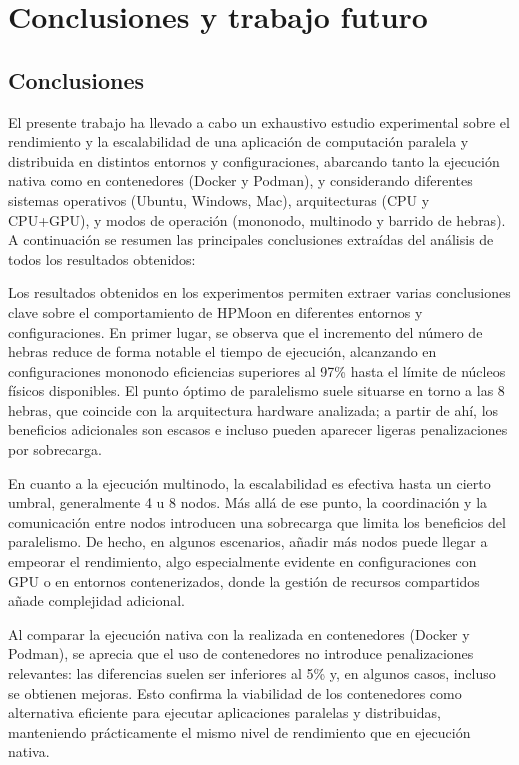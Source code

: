 \chapter{Conclusiones y trabajo futuro}\label{cap:conclusiones}


\section{Conclusiones}


El presente trabajo ha llevado a cabo un exhaustivo estudio experimental sobre el rendimiento y la escalabilidad de una aplicación de computación paralela y distribuida en distintos entornos y configuraciones, abarcando tanto la ejecución nativa como en contenedores (Docker y Podman), y considerando diferentes sistemas operativos (Ubuntu, Windows, Mac), arquitecturas (CPU y CPU+GPU), y modos de operación (mononodo, multinodo y barrido de hebras). A continuación se resumen las principales conclusiones extraídas del análisis de todos los resultados obtenidos:

Los resultados obtenidos en los experimentos permiten extraer varias conclusiones clave sobre el comportamiento de HPMoon en diferentes entornos y configuraciones. En primer lugar, se observa que el incremento del número de hebras reduce de forma notable el tiempo de ejecución, alcanzando en configuraciones mononodo eficiencias superiores al 97\% hasta el límite de núcleos físicos disponibles. El punto óptimo de paralelismo suele situarse en torno a las 8 hebras, que coincide con la arquitectura hardware analizada; a partir de ahí, los beneficios adicionales son escasos e incluso pueden aparecer ligeras penalizaciones por sobrecarga.

En cuanto a la ejecución multinodo, la escalabilidad es efectiva hasta un cierto umbral, generalmente 4 u 8 nodos. Más allá de ese punto, la coordinación y la comunicación entre nodos introducen una sobrecarga que limita los beneficios del paralelismo. De hecho, en algunos escenarios, añadir más nodos puede llegar a empeorar el rendimiento, algo especialmente evidente en configuraciones con GPU o en entornos contenerizados, donde la gestión de recursos compartidos añade complejidad adicional.

Al comparar la ejecución nativa con la realizada en contenedores (Docker y Podman), se aprecia que el uso de contenedores no introduce penalizaciones relevantes: las diferencias suelen ser inferiores al 5\% y, en algunos casos, incluso se obtienen mejoras. Esto confirma la viabilidad de los contenedores como alternativa eficiente para ejecutar aplicaciones paralelas y distribuidas, manteniendo prácticamente el mismo nivel de rendimiento que en ejecución nativa.

